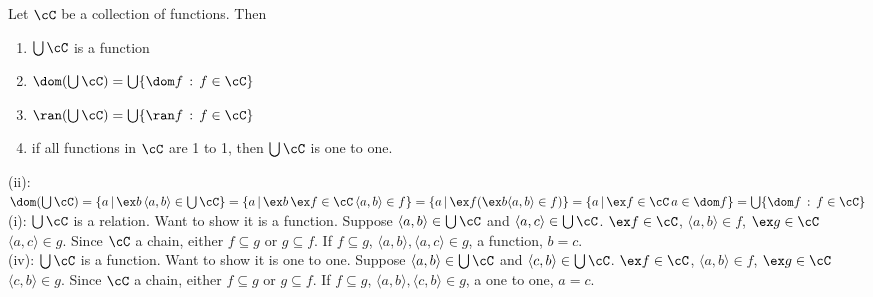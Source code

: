 \begin{lemma}
    Let $\cC$ be a collection of functions. Then 
    \begin{enumerate}[label = (\roman*)]
        \item $\bigcup \cC$ is a function 
        \item $\dom(\bigcup \cC) = \bigcup \{\dom f \, : \, f \in \cC\}$ 
        \item $\ran(\bigcup \cC) = \bigcup \{\ran f \, : \, f \in \cC\}$ 
        \item if all functions in $\cC$ are 1 to 1, then $\bigcup \cC$ is one to one. 
    \end{enumerate}
\end{lemma}

\begin{pf}
(ii): $\dom(\bigcup \cC) = \{a \, | \, \ex b \, \langle a , b \rangle \in \bigcup \cC\} = \{a \, | \, \ex b \, \ex f\in \cC \, \langle a , b \rangle \in f \} = \{a \, | \, \ex f (\ex b \langle a, b \rangle \in f) \} = \{a \, | \, \ex f \in \cC \, a \in \dom f\} = \bigcup \{\dom f \, : \, f \in \cC\}$ \\
(i): $\bigcup \cC$ is a relation. Want to show it is a function. Suppose $\langle a, b \rangle \in \bigcup \cC$ and $\langle a, c \rangle \in \bigcup \cC$. $\ex f \in \cC$, $\langle a , b \rangle \in f$, $\ex g \in \cC$ $\langle a, c \rangle \in g$. Since $\cC$ a chain, either $f \subseteq g$ or $g \subseteq f$. If $f \subseteq g$, $\langle a , b \rangle, \langle a, c \rangle \in g$, a function, $b=c$. \\
(iv): $\bigcup \cC$ is a function. Want to show it is one to one. Suppose $\langle a, b \rangle \in \bigcup \cC$ and $\langle c, b \rangle \in \bigcup \cC$. $\ex f \in \cC$, $\langle a , b \rangle \in f$, $\ex g \in \cC$ $\langle c, b \rangle \in g$. Since $\cC$ a chain, either $f \subseteq g$ or $g \subseteq f$. If $f \subseteq g$, $\langle a , b \rangle, \langle c, b \rangle \in g$, a one to one, $a=c$.
\end{pf}